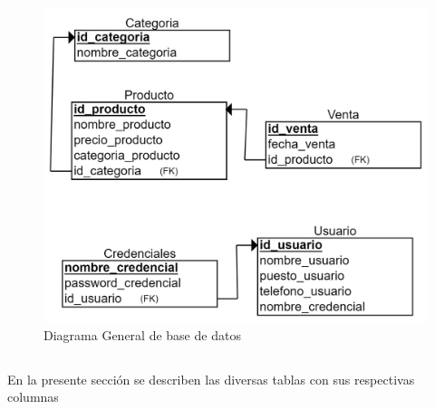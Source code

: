 \documentclass[10pt,a4paper]{article}
\begin{document}
	\begin{figure}[H]
		\includegraphics[scale=.35]{modeloRelacional}
		\centering
		\caption{Diagrama General de base de datos}
		\label{img:modeloRelacional}
	\end{figure} 

\pagebreak

\subsection{
	\textit{
		\color{colorESCOM}{Diccionario de datos}
	}
}

En la presente sección se describen las diversas tablas con sus respectivas columnas
\end{document}
